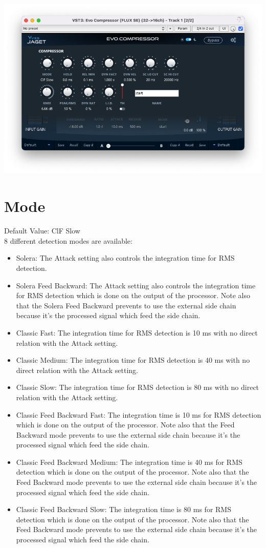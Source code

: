 \documentclass[
  letterpaper,
  DIV=11,
  numbers=noendperiod]{scrreport}
\providecommand{\tightlist}{%
  \setlength{\itemsep}{0pt}\setlength{\parskip}{0pt}}\usepackage{longtable,booktabs,array}
\begin{document}
\includegraphics{include/evoComp_geek.png}

\hypertarget{mode-1}{%
\section{Mode}\label{mode-1}}

Default Value: ClF Slow\\
8 different detection modes are available:

\begin{itemize}
\tightlist
\item
  Solera: The Attack setting also controls the integration time for RMS
  detection.
\item
  Solera Feed Backward: The Attack setting also controls the integration
  time for RMS detection which is done on the output of the processor.
  Note also that the Solera Feed Backward prevents to use the external
  side chain because it's the processed signal which feed the side
  chain.
\item
  Classic Fast: The integration time for RMS detection is 10 ms with no
  direct relation with the Attack setting.
\item
  Classic Medium: The integration time for RMS detection is 40 ms with
  no direct relation with the Attack setting.
\item
  Classic Slow: The integration time for RMS detection is 80 ms with no
  direct relation with the Attack setting.
\item
  Classic Feed Backward Fast: The integration time is 10 ms for RMS
  detection which is done on the output of the processor. Note also that
  the Feed Backward mode prevents to use the external side chain because
  it's the processed signal which feed the side chain.
\item
  Classic Feed Backward Medium: The integration time is 40 ms for RMS
  detection which is done on the output of the processor. Note also that
  the Feed Backward mode prevents to use the external side chain because
  it's the processed signal which feed the side chain.
\item
  Classic Feed Backward Slow: The integration time is 80 ms for RMS
  detection which is done on the output of the processor. Note also that
  the Feed Backward mode prevents to use the external side chain because
  it's the processed signal which feed the side chain.
\end{itemize}
\end{document}
